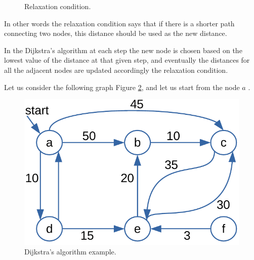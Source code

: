 \begin{figure}[H]

\centering
{}

\caption[Relaxation condition.]{Relaxation condition.}
\label{graphs_12}
\end{figure}

In other words the relaxation condition says that if there is a shorter path connecting two nodes, this distance should be used as the new distance.

In the Dijkstra's algorithm at each step the new node is chosen based on the lowest value of the distance at that given step, and eventually the distances for all the adjacent nodes are updated accordingly the relaxation condition.

Let us consider the following graph Figure \ref{graphs_13}, and let us start from the node \(a\) \cite{dijkstraexplaination}.

\begin{figure}[H]
	\begin{center}
		\includegraphics[scale=.6]{chapters/graphs/images/graphs_13.pdf}
		\caption[Dijkstra's algorithms example.]{Dijkstra's algorithm example.}
		\label{graphs_13}
	\end{center}
\end{figure}

